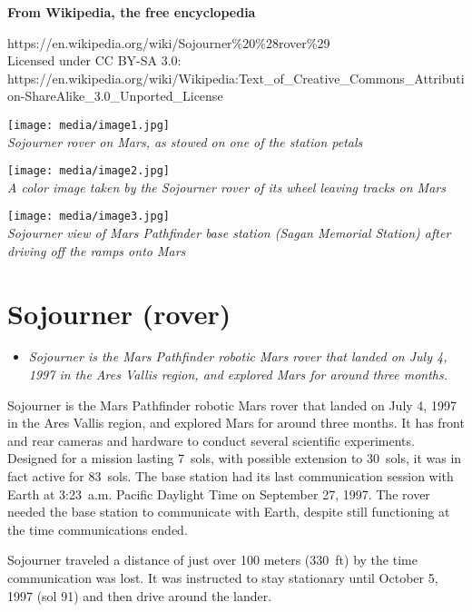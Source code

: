 \textbf{From Wikipedia, the free encyclopedia}

https://en.wikipedia.org/wiki/Sojourner\%20\%28rover\%29\\
Licensed under CC BY-SA 3.0:\\
https://en.wikipedia.org/wiki/Wikipedia:Text\_of\_Creative\_Commons\_Attribution-ShareAlike\_3.0\_Unported\_License

\texttt{[image: media/image1.jpg]}\\
\emph{Sojourner rover on Mars, as stowed on one of the station petals}

\texttt{[image: media/image2.jpg]}\\
\emph{A color image taken by the Sojourner rover of its wheel leaving
tracks on Mars}

\texttt{[image: media/image3.jpg]}\\
\emph{Sojourner view of Mars Pathfinder base station (Sagan Memorial
Station) after driving off the ramps onto Mars}

\section{Sojourner (rover)}\label{sojourner-rover}

\begin{itemize}
\item
  \emph{Sojourner is the Mars Pathfinder robotic Mars rover that landed
  on July 4, 1997 in the Ares Vallis region, and explored Mars for
  around three months.}
\end{itemize}

Sojourner is the Mars Pathfinder robotic Mars rover that landed on July
4, 1997 in the Ares Vallis region, and explored Mars for around three
months. It has front and rear cameras and hardware to conduct several
scientific experiments. Designed for a mission lasting 7~sols, with
possible extension to 30~sols, it was in fact active for 83~sols. The
base station had its last communication session with Earth at 3:23~a.m.
Pacific Daylight Time on September 27, 1997. The rover needed the base
station to communicate with Earth, despite still functioning at the time
communications ended.

Sojourner traveled a distance of just over 100 meters (330~ft) by the
time communication was lost. It was instructed to stay stationary until
October 5, 1997 (sol 91) and then drive around the lander.

